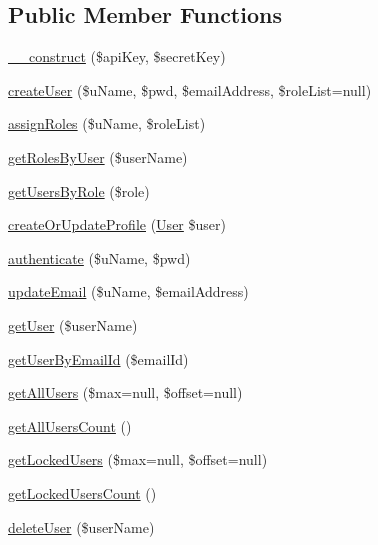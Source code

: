 \subsection*{Public Member Functions}
\begin{DoxyCompactItemize}
\item 
\hyperlink{class_user_service_a49f2ad222e06420736d750e167d55d7c}{\+\_\+\+\_\+construct} (\$api\+Key, \$secret\+Key)
\item 
\hyperlink{class_user_service_a2d19c5ab1596e9c4cc4a253654fcea23}{create\+User} (\$u\+Name, \$pwd, \$email\+Address, \$role\+List=null)
\item 
\hyperlink{class_user_service_ac892b43848dd337e5c3a061e083dae34}{assign\+Roles} (\$u\+Name, \$role\+List)
\item 
\hyperlink{class_user_service_a0124d32cb11b6abbb656bef29ed9843b}{get\+Roles\+By\+User} (\$user\+Name)
\item 
\hyperlink{class_user_service_abe4c3335ae7c1069496dce920ee95016}{get\+Users\+By\+Role} (\$role)
\item 
\hyperlink{class_user_service_a172bef4b570888f19cace199307d7ff9}{create\+Or\+Update\+Profile} (\hyperlink{class_user}{User} \$user)
\item 
\hyperlink{class_user_service_a0399a1547a735e805f32a78dfb0c6536}{authenticate} (\$u\+Name, \$pwd)
\item 
\hyperlink{class_user_service_a7b7f98f3ebdf1b742227dcf817ff383e}{update\+Email} (\$u\+Name, \$email\+Address)
\item 
\hyperlink{class_user_service_a9dde309a8616ea08b90afedc4cc0535b}{get\+User} (\$user\+Name)
\item 
\hyperlink{class_user_service_a7a7cb1fc1db34a0f256ecd8d400269a0}{get\+User\+By\+Email\+Id} (\$email\+Id)
\item 
\hyperlink{class_user_service_abf8a1ca4140b4ca6379eed1266625ecc}{get\+All\+Users} (\$max=null, \$offset=null)
\item 
\hyperlink{class_user_service_a9aa2ae795472c60841fbc5f285a2fd63}{get\+All\+Users\+Count} ()
\item 
\hyperlink{class_user_service_aad7ca18b49e223009c0759a5b02d3bc1}{get\+Locked\+Users} (\$max=null, \$offset=null)
\item 
\hyperlink{class_user_service_a2e776606f52f13787ae537ce25092ddb}{get\+Locked\+Users\+Count} ()
\item 
\hyperlink{class_user_service_a2686e125d02a182347c15dead8636740}{delete\+User} (\$user\+Name)
\item 

\end{DoxyCompactItemize}
